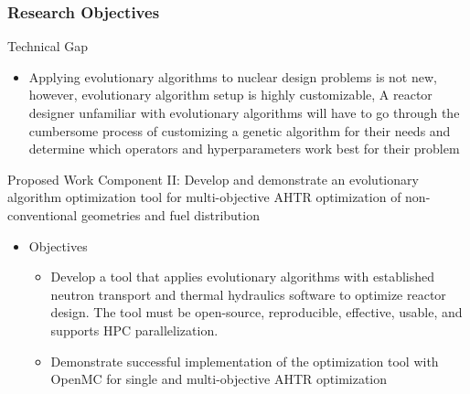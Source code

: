\begin{frame}
    \frametitle{Research Objectives}
    \begin{block}{Technical Gap}
      \begin{itemize}
        \item Applying evolutionary algorithms to nuclear design problems is not new,
        however, evolutionary algorithm setup is highly customizable, A reactor 
        designer unfamiliar with evolutionary algorithms will have to go through 
        the cumbersome process of customizing a genetic algorithm for their
        needs and determine which operators and hyperparameters work best for their problem
      \end{itemize}
    \end{block}
    \begin{block}{Proposed Work Component II: Develop and demonstrate an evolutionary 
        algorithm optimization tool for multi-objective AHTR optimization of 
        non-conventional geometries and fuel distribution}
      \begin{itemize}
        \item Objectives
        \begin{itemize}
            \item Develop a tool that applies evolutionary algorithms with established 
            neutron transport and thermal hydraulics software to optimize reactor 
            design. The tool must be open-source, reproducible, effective, usable,
            and supports HPC parallelization. 
            \item Demonstrate successful implementation of the optimization tool 
            with OpenMC for single and multi-objective AHTR optimization
        \end{itemize}
        \end{itemize}
    \end{block}
  \end{frame}